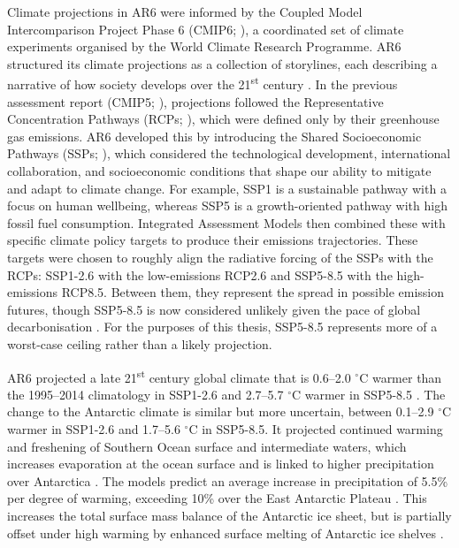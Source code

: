 Climate projections in AR6 were informed by the Coupled Model Intercomparison Project Phase 6 (CMIP6; \citealt{eyringOverviewCoupledModel2016}), a coordinated set of climate experiments organised by the World Climate Research Programme. AR6 structured its climate projections as a collection of storylines, each describing a narrative of how society develops over the 21\textsuperscript{st} century \citep{oneillScenarioModelIntercomparison2016}. In the previous assessment report (CMIP5; \citealt{taylorOverviewCMIP5Experiment2012}), projections followed the Representative Concentration Pathways (RCPs; \citealt{vanvuurenRepresentativeConcentrationPathways2011}), which were defined only by their greenhouse gas emissions. AR6 developed this by introducing the Shared Socioeconomic Pathways (SSPs; \citealt{riahiSharedSocioeconomicPathways2017}), which considered the technological development, international collaboration, and socioeconomic conditions that shape our ability to mitigate and adapt to climate change. For example, SSP1 is a sustainable pathway with a focus on human wellbeing, whereas SSP5 is a growth-oriented pathway with high fossil fuel consumption. Integrated Assessment Models then combined these with specific climate policy targets to produce their emissions trajectories. These targets were chosen to roughly align the radiative forcing of the SSPs with the RCPs: SSP1-2.6 with the low-emissions RCP2.6 and SSP5-8.5 with the high-emissions RCP8.5. Between them, they represent the spread in possible emission futures, though SSP5-8.5 is now considered unlikely given the pace of global decarbonisation \citep{hausfatherAssessmentCurrentPolicy2025}. For the purposes of this thesis, SSP5-8.5 represents more of a worst-case ceiling rather than a likely projection.

AR6 projected a late 21\textsuperscript{st} century global climate that is 0.6--2.0 $^\circ$C warmer than the 1995--2014 climatology in SSP1-2.6 and 2.7--5.7 $^\circ$C warmer in SSP5-8.5 \citep{Lee2021_IPCC_WGI_Ch4}. The change to the Antarctic climate is similar but more uncertain, between 0.1--2.9 $^\circ$C warmer in SSP1-2.6 and 1.7--5.6 $^\circ$C in SSP5-8.5. It projected continued warming and freshening of Southern Ocean surface and intermediate waters, which increases evaporation at the ocean surface and is linked to higher precipitation over Antarctica \citep{fox-kemperOceanCryosphereSea2021,douvilleWaterCycleChanges2021}. The models predict an average increase in precipitation of 5.5\% per degree of warming, exceeding 10\% over the East Antarctic Plateau \citep{nicolaRevisitingTemperatureSensitivity2023}. This increases the total surface mass balance of the Antarctic ice sheet, but is partially offset under high warming by enhanced surface melting of Antarctic ice shelves \citep{kittelDivergingFutureSurface2021}.

